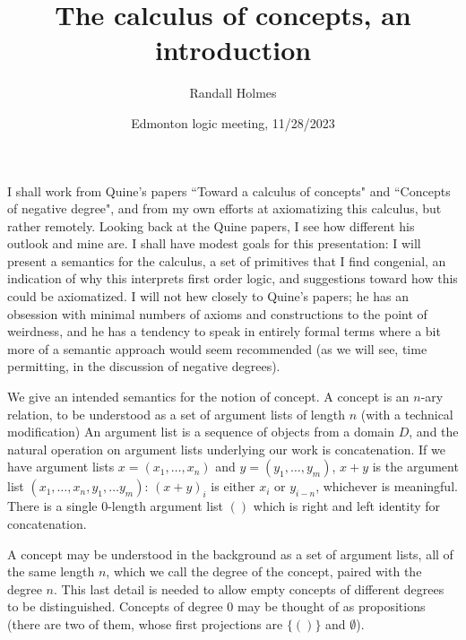 \documentclass{slides}
\title{The calculus of concepts, an introduction}
\author{Randall Holmes}
\date{Edmonton logic meeting, 11/28/2023}
\begin{document}
\begin{slide}

\maketitle

\end{slide}

\begin{slide}

I shall work from Quine's papers ``Toward a calculus of concepts" and ``Concepts of negative degree", and from my own efforts at axiomatizing this calculus, but rather remotely.  Looking back at the Quine papers, I see how different his outlook and mine are.  I shall have modest goals for this presentation:  I will present a semantics for the calculus, a set of primitives that I find congenial, an indication of why this interprets first order logic, and suggestions toward how this could be axiomatized.   I will not hew closely to Quine's papers;  he has an obsession with minimal numbers of axioms and constructions to the point of weirdness, and he has a tendency to speak in entirely formal terms where a bit more of a semantic approach would seem recommended (as we will see, time permitting, in the discussion of negative degrees).

\end{slide}

\begin{slide}

We give an intended semantics for the notion of concept.  A concept is an $n$-ary relation, to be understood as a set of argument lists of length $n$ (with a technical modification)
An argument list is a sequence of objects from a domain $D$, and the natural operation on argument lists underlying our work is concatenation.  If we have argument lists $x=(x_1,\ldots,x_n)$ and $y=(y_1,\ldots,y_m)$, $x+y$ is the argument list $(x_1,\ldots,x_n,y_1,\ldots y_m)$:  $(x+y)_i$ is either $x_i$ or $y_{i-n}$, whichever is meaningful.  There is a single 0-length argument list $()$ which is right and left identity for concatenation.

A concept may be understood in the background as a set of argument lists, all of the same length $n$, which we call the degree of the concept, paired with the degree $n$.  This last detail is needed to allow empty concepts of different degrees to be distinguished.   Concepts of degree 0
may be thought of as propositions (there are two of them, whose first projections are $\{()\}$ and $\emptyset$).

\end{slide}
\end{document}
